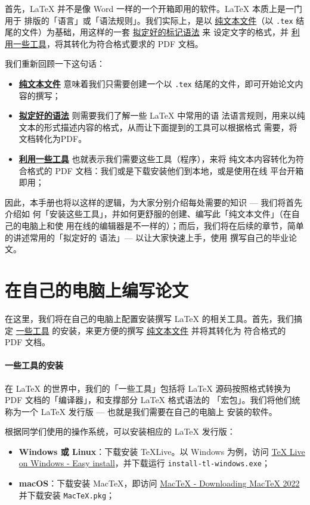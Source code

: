 首先，\LaTeX{} 并不是像 Word 一样的一个开箱即用的软件。\LaTeX{} 本质上是一门用于
排版的「语言」或「语法规则」。我们实际上，是以 \underline{纯文本文件}（以
\texttt{.tex} 结尾的文件）为基础，用这样的一套 \underline{拟定好的标记语法} 来
设定文字的格式，并 \underline{利用一些工具}，将其转化为符合格式要求的 PDF 文档。

我们重新回顾一下这句话：

\begin{itemize}[noitemsep]
  \item \textbf{\underline{纯文本文件}} 意味着我们只需要创建一个以 \texttt{.tex}
  结尾的文件，即可开始论文内容的撰写；
  \item \textbf{\underline{拟定好的语法}} 则需要我们了解一些 \LaTeX{} 中常用的语
  法语言规则，用来以纯文本的形式描述内容的格式，从而让下面提到的工具可以根据格式
  需要，将文档转化为PDF。
  \item \textbf{\underline{利用一些工具}} 也就表示我们需要这些工具（程序），来将
  纯文本内容转化为符合格式的 PDF 文档：我们或是下载安装他们到本地，或是使用在线
  平台开箱即用；
\end{itemize}

因此，本手册也将以这样的逻辑，为大家分别介绍每处需要的知识 --- 我们将首先介绍如
何「安装这些工具」，并如何更舒服的创建、编写此「纯文本文件」（在自己的电脑上和使
用在线的编辑器是不一样的）；而后，我们将在后续的章节，简单的讲述常用的「拟定好的
语法」--- 以让大家快速上手，使用 \BIThesis{} 撰写自己的毕业论文。

\section{在自己的电脑上编写论文}

在这里，我们将在自己的电脑上配置安装撰写 \LaTeX{} 的相关工具。首先，我们搞定
\underline{一些工具} 的安装，来更方便的撰写 \underline{纯文本文件} 并将其转化为
符合格式的 PDF 文档。

\paragraph{一些工具的安装} 在 \LaTeX{} 的世界中，我们的「一些工具」包括将
\LaTeX{} 源码按照格式转换为 PDF 文档的「编译器」，和支撑部分 \LaTeX{} 格式语法的
「宏包」。我们将他们统称为一个 \LaTeX{} 发行版 --- 也就是我们需要在自己的电脑上
安装的软件。

根据同学们使用的操作系统，可以安装相应的 \LaTeX{} 发行版：

\begin{itemize}[noitemsep]
  \item \textbf{Windows 或 Linux}：下载安装 \TeX{}Live。以 Windows 为例，访问
  \href{https://www.tug.org/texlive/windows.html}{TeX Live on Windows - Easy
  install}，并下载运行 \texttt{install-tl-windows.exe}；
  \item \textbf{macOS}：下载安装 Mac\TeX{}，即访问
  \href{https://www.tug.org/mactex/mactex-download.html}{MacTeX - Downloading
  MacTeX 2022} 并下载安装 \texttt{MacTeX.pkg}；
\end{itemize}

